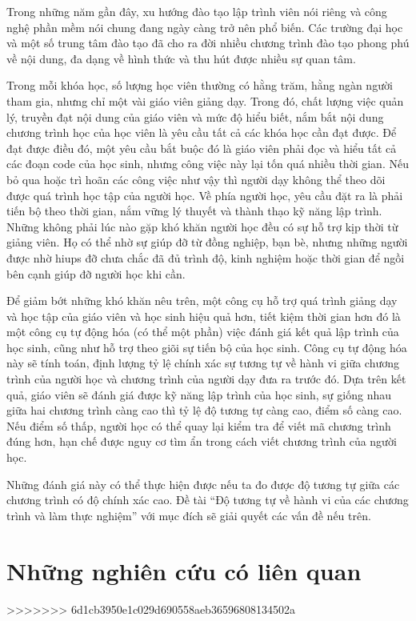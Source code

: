 Trong những năm gần đây, xu hướng đào tạo lập trình viên nói riêng và công nghệ phần mềm nói chung đang ngày càng trở nên phổ biến. Các trường đại học và một số trung tâm đào tạo đã cho ra đời nhiều chương trình đào tạo phong phú về nội dung, đa dạng về hình thức và thu hút được nhiều sự quan tâm.
	
Trong mỗi khóa học, số lượng học viên thường có hằng trăm, hằng ngàn người tham gia, nhưng chỉ một vài giáo viên giảng dạy. Trong đó, chất lượng việc quản lý, truyền đạt nội dung của giáo viên và mức độ hiểu biết, nắm bắt nội dung chương trình học của học viên là yêu cầu tất cả các khóa học cần đạt được. Để đạt được điều đó, một yêu cầu bắt buộc đó là giáo viên phải đọc và hiểu tất cả các đoạn code của học sinh, nhưng công việc này lại tốn quá nhiều thời gian. Nếu bỏ qua hoặc trì hoãn các công việc như vậy thì người dạy không thể theo dõi được quá trình học tập của người học. Về phía người học, yêu cầu đặt ra là phải tiến bộ theo thời gian, nắm vững lý thuyết và thành thạo kỹ năng lập trình. Những không phải lúc nào gặp khó khăn người học đều có sự hỗ trợ kịp thời từ giảng viên. Họ có thể nhờ sự giúp đỡ từ đồng nghiệp, bạn bè, nhưng những người được nhờ hiups đỡ chưa chắc đã đủ trình độ, kinh nghiệm hoặc thời gian để ngồi bên cạnh giúp đỡ người học khi cần.
	
Để giảm bớt những khó khăn nêu trên, một công cụ hỗ trợ quá trình giảng dạy và học tập của giáo viên và học sinh hiệu quả hơn, tiết kiệm thời gian hơn đó là một công cụ tự động hóa (có thể một phần) việc đánh giá kết quả lập trình của học sinh, cũng như hỗ trợ theo giõi sự tiến bộ của học sinh. Công cụ tự động hóa này sẽ tính toán, định lượng tỷ lệ chính xác sự tương tự về hành vi giữa chương trình của người học và chương trình của người dạy đưa ra trước đó. Dựa trên kết quả, giáo viên sẽ đánh giá được kỹ năng lập trình của học sinh, sự giống nhau giữa hai chương trình càng cao thì tỷ lệ độ tương tự càng cao, điểm số càng cao. Nếu điểm số thấp, người học có thể quay lại kiểm tra để viết mã chương trình đúng hơn, hạn chế được nguy cơ tìm ẩn trong cách viết chương trình của người học.
	
Những đánh giá này có thể thực hiện được nếu ta đo được độ tương tự giữa các chương trình có độ chính xác cao. Đề tài “Độ tương tự về hành vi của các chương trình và làm thực nghiệm”  với mục đích sẽ giải quyết các vấn đề nếu trên.

\section{Những nghiên cứu có liên quan}


>>>>>>> 6d1cb3950e1c029d690558aeb36596808134502a
